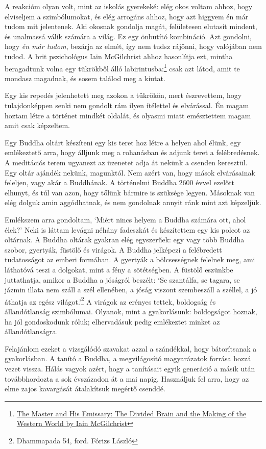 A reakcióm olyan volt, mint az iskolás gyerekeké: elég okos voltam
ahhoz, hogy elviseljem a szimbólumokat, és elég arrogáns ahhoz, hogy azt
higgyem én már tudom mit jelentenek. Aki okosnak gondolja magát,
felületesen elutasít mindent, és unalmassá válik számára a világ. Ez egy
önbutító kombináció. Azt gondolni, hogy \emph{én már tudom}, bezárja az
elmét, így nem tudsz rájönni, hogy valójában nem tudod. A brit
pszichológus Iain McGilchrist ahhoz hasonlítja ezt, mintha beragadtunk
volna egy tükrökből álló labirintusba:\footnote{\href{https://www.goodreads.com/book/show/6968772-the-master-and-his-emissary}{The
  Master and His Emissary: The Divided Brain and the Making of the
  Western World by Iain McGilchrist}} csak azt látod, amit te mondasz
magadnak, és sosem találod meg a kiutat.

Egy kis repedés jelenhetett meg azokon a tükrökön, mert észrevettem,
hogy tulajdonképpen senki nem gondolt rám ilyen ítélettel és elvárással.
Én magam hoztam létre a történet mindkét oldalát, és olyasmi miatt
emésztettem magam amit csak képzeltem.

Egy Buddha oltárt készíteni egy kis teret hoz létre a helyen ahol élünk,
egy emlékeztető arra, hogy álljunk meg a rohanásban és adjunk teret a
felébredésnek. A meditációs terem ugyanezt az üzenetet adja át nekünk a
csenden keresztül. Egy oltár ajándék nekünk, magunktól. Nem azért van,
hogy mások elvárásainak feleljen, vagy akár a Buddhának. A történelmi
Buddha 2600 évvel ezelőtt elhunyt, és túl van azon, hogy tőlünk bármire
is szüksége legyen. Másoknak van elég dolguk amin aggódhatnak, és nem
gondolnak annyit ránk mint azt képzeljük.

Emlékszem arra gondoltam, `Miért nincs helyem a Buddha számára ott, ahol
élek?' Neki is láttam levágni néhány fadeszkát és készítettem egy kis
polcot az oltárnak. A Buddha oltárak gyakran elég egyszerűek: egy vagy
több Buddha szobor, gyertyák, füstölő és virágok. A Buddha jelképezi a
felébredett tudatosságot az emberi formában. A gyertyák a bölcsességnek
felelnek meg, ami láthatóvá teszi a dolgokat, mint a fény a sötétségben.
A füstölő eszünkbe juttathatja, amikor a Buddha a jóságról beszélt: `Se
szantálfa, se tagara, se jázmin illata nem száll a szél ellenében, a
jóság viszont szembeszáll a széllel, a jó áthatja az egész
világot.'\footnote{Dhammapada 54, ford. Fórizs László} A virágok az
erényes tettek, boldogság és állandótlanság szimbólumai. Olyanok, mint a
gyakorlásunk: boldogságot hoznak, ha jól gondoskodunk róluk;
elhervadásuk pedig emlékeztet minket az állandótlanságra.

Felajánlom ezeket a vizsgálódó szavakat azzal a szándékkal, hogy
bátorítsanak a gyakorlásban. A tanító a Buddha, a megvilágosító
magyarázatok forrása hozzá vezet vissza. Hálás vagyok azért, hogy a
tanításait egyik generáció a másik után továbbhordozta a sok évszázadon
át a mai napig. Használjuk fel arra, hogy az elme zajos kavargását
átalakítsuk megértő csenddé.
